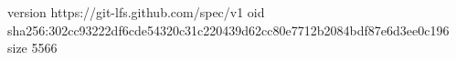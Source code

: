 version https://git-lfs.github.com/spec/v1
oid sha256:302cc93222df6cde54320c31c220439d62cc80e7712b2084bdf87e6d3ee0c196
size 5566
